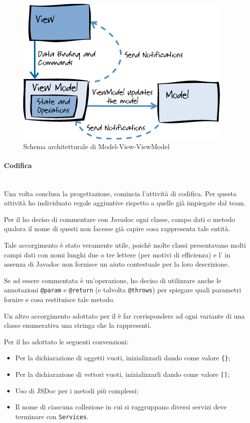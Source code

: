 \begin{figure}[H]%
\centering
\includegraphics[width=.7\columnwidth]{immagini/mvvm}
\caption{Schema architetturale di Model-View-ViewModel}
\label{fig:mvvm}%
\end{figure}

\paragraph{Codifica} \mbox{} \\

Una volta conclusa la progettazione, comincia l'attività di codifica. Per
questa attività ho individuato regole aggiuntive rispetto a quelle già
impiegate dal team.

Per il \BKEND{} ho deciso di commentare con Javadoc ogni classe, campo dati o
metodo qualora il nome di questi non facesse già capire cosa rappresenta tale
entità.

Tale accorgimento è stato veramente utile, poichè molte classi presentavano
molti campi dati con nomi lunghi due o tre lettere (per motivi di efficienza)
e l' in assenza di Javadoc non fornisce un aiuto contestuale per la
loro descrizione.

Se ad essere commentata è un'operazione, ho deciso di utilizzare anche le
annotazioni \texttt{@param} e \texttt{@return} (e talvolta \texttt{@throws})
per spiegare quali parametri fornire e cosa restituisce tale metodo.

Un altro accorgimento adottato per il \BKEND{} è far corrispondere ad ogni
variante di una classe enumerativa una stringa che la rappresenti.

Per il \FREND{} ho adottato le seguenti convenzioni:

\begin{itemize}
\item Per la dichiarazione di oggetti vuoti, inizializzarli dando come valore
  \texttt{\{\}};
\item Per la dichiarazione di vettori vuoti, inizializzarli dando come valore
  \texttt{[]};
\item Uso di JSDoc per i metodi più complessi;
\item Il nome di ciascuna collezione in cui si raggruppano diversi servizi
  deve terminare con \texttt{Services}.
\end{itemize}

